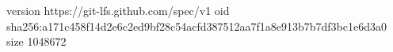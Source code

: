 version https://git-lfs.github.com/spec/v1
oid sha256:a171c458f14d2e6c2ed9bf28c54acfd387512aa7f1a8e913b7b7df3bc1e6d3a0
size 1048672
